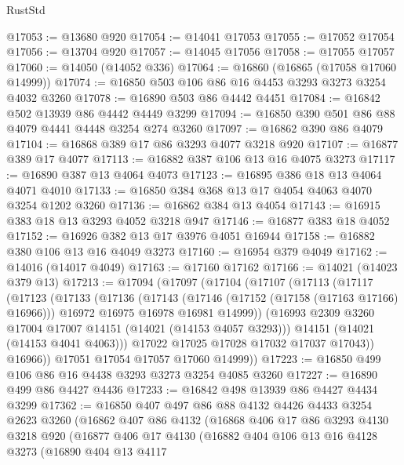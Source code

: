 \begin{lexlean}{RustStd}
\begin{coremodule}
{\begin{coremodule}
{{{{{{{{{{{{{{{{{{{{{{{{{{{{{{{{{{{{{{{@17053 := @13680 @920
@17054 := @14041 @17053
@17055 := @17052 @17054
@17056 := @13704 @920
@17057 := @14045 @17056
@17058 := @17055 @17057
@17060 := @14050 (@14052 @336)
@17064 := @16860 (@16865 (@17058 @17060 @14999))
@17074 := @16850 @503 @106 @86 @16 @4453 @3293 @3273 @3254 @4032 @3260
@17078 := @16890 @503 @86 @4442 @4451
@17084 := @16842 @502 @13939 @86 @4442 @4449 @3299
@17094 := @16850 @390 @501 @86 @88 @4079 @4441 @4448 @3254 @274 @3260
@17097 := @16862 @390 @86 @4079
@17104 := @16868 @389 @17 @86 @3293 @4077 @3218 @920
@17107 := @16877 @389 @17 @4077
@17113 := @16882 @387 @106 @13 @16 @4075 @3273
@17117 := @16890 @387 @13 @4064 @4073
@17123 := @16895 @386 @18 @13 @4064 @4071 @4010
@17133 := @16850 @384 @368 @13 @17 @4054 @4063 @4070 @3254 @1202 @3260
@17136 := @16862 @384 @13 @4054
@17143 := @16915 @383 @18 @13 @3293 @4052 @3218 @947
@17146 := @16877 @383 @18 @4052
@17152 := @16926 @382 @13 @17 @3976 @4051 @16944
@17158 := @16882 @380 @106 @13 @16 @4049 @3273
@17160 := @16954 @379 @4049
@17162 := @14016 (@14017 @4049)
@17163 := @17160 @17162
@17166 := @14021 (@14023 @379 @13)
@17213 := @17094
    (@17097
      (@17104
        (@17107
          (@17113
            (@17117
              (@17123
                (@17133
                  (@17136
                    (@17143
                      (@17146 (@17152 (@17158 (@17163 @17166) @16966)))
                      @16972
                      @16975
                      @16978
                      @16981
                      @14999))
                  (@16993 @2309 @3260 @17004 @17007 @14151 (@14021 (@14153 @4057 @3293)))
                  @14151
                  (@14021 (@14153 @4041 @4063)))
                @17022
                @17025
                @17028
                @17032
                @17037
                @17043))
            @16966))
        @17051
        @17054
        @17057
        @17060
        @14999))
@17223 := @16850 @499 @106 @86 @16 @4438 @3293 @3273 @3254 @4085 @3260
@17227 := @16890 @499 @86 @4427 @4436
@17233 := @16842 @498 @13939 @86 @4427 @4434 @3299
@17362 := @16850
    @407
    @497
    @86
    @88
    @4132
    @4426
    @4433
    @3254
    @2623
    @3260
    (@16862
      @407
      @86
      @4132
      (@16868
        @406
        @17
        @86
        @3293
        @4130
        @3218
        @920
        (@16877
          @406
          @17
          @4130
          (@16882
            @404
            @106
            @13
            @16
            @4128
            @3273
            (@16890
              @404
              @13
              @4117
}}}}}}}}}}}}}}}}}}}}}}}}}}}}}}}}}}}}}}}
\end{coremodule}}
\end{coremodule}
\end{lexlean}
